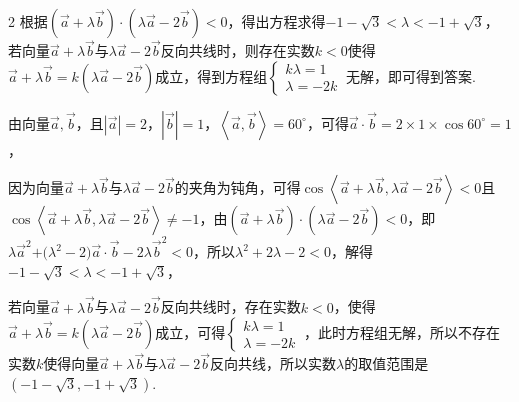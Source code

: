 \begin{multicols}{2}
\bindp [分析]根据\(\left( \overrightarrow{a} + \lambda\overrightarrow{b} \right) \cdot \left( \lambda\overrightarrow{a} - 2\overrightarrow{b} \right) < 0\)，得出方程求得\(- 1 - \sqrt{3} < \lambda < - 1 + \sqrt{3}\)，若向量\(\overrightarrow{a} + \lambda\overrightarrow{b}\)与\(\lambda\overrightarrow{a} - 2\overrightarrow{b}\)反向共线时，则存在实数\(k < 0\)使得\(\overrightarrow{a} + \lambda\overrightarrow{b} = k(\lambda\overrightarrow{a} - 2\overrightarrow{b})\)成立，得到方程组\(\left\{ \begin{array}{r}
k\lambda = 1 \\
\lambda = - 2k
\end{array} \right.\ \)无解，即可得到答案.

\bindp [详解]由向量\(\overrightarrow{a},\overrightarrow{b}\)，且\(\left| \overrightarrow{a} \right| = 2\)，\(\left| \overrightarrow{b} \right| = 1\)，\(\left\langle \overrightarrow{a},\overrightarrow{b} \right\rangle = 60^{\circ}\)，可得\(\overrightarrow{a} \cdot \overrightarrow{b} = 2 \times 1 \times \cos 60^{\circ} = 1\)，

\bindp 因为向量\(\overrightarrow{a} + \lambda\overrightarrow{b}\)与\(\lambda\overrightarrow{a} - 2\overrightarrow{b}\)的夹角为钝角，可得\(\cos\left\langle \overrightarrow{a} + \lambda\overrightarrow{b},\lambda\overrightarrow{a} - 2\overrightarrow{b} \right\rangle < 0\)且\(\cos\left\langle \overrightarrow{a} + \lambda\overrightarrow{b},\lambda\overrightarrow{a} - 2\overrightarrow{b} \right\rangle \neq - 1\)，由\(\left( \overrightarrow{a} + \lambda\overrightarrow{b} \right) \cdot \left( \lambda\overrightarrow{a} - 2\overrightarrow{b} \right) < 0\)，即\(\lambda{\overrightarrow{a}}^{2}\text{+(}\lambda^{2} - 2)\overrightarrow{a} \cdot \overrightarrow{b} - 2\lambda{\overrightarrow{b}}^{2} < 0\)，所以\(\lambda^{2} + 2\lambda - 2 < 0\)，解得\(- 1 - \sqrt{3} < \lambda < - 1 + \sqrt{3}\)，

\bindp 若向量\(\overrightarrow{a} + \lambda\overrightarrow{b}\)与\(\lambda\overrightarrow{a} - 2\overrightarrow{b}\)反向共线时，存在实数\(k < 0\)，使得\(\overrightarrow{a} + \lambda\overrightarrow{b} = k(\lambda\overrightarrow{a} - 2\overrightarrow{b})\)成立，可得\(\left\{ \begin{array}{r}
k\lambda = 1 \\
\lambda = - 2k
\end{array} \right.\ \)，此时方程组无解，所以不存在实数\(k\)使得向量\(\overrightarrow{a} + \lambda\overrightarrow{b}\)与\(\lambda\overrightarrow{a} - 2\overrightarrow{b}\)反向共线，所以实数\(\lambda\)的取值范围是\(\left( - 1 - \sqrt{3}, - 1 + \sqrt{3} \right)\).


\end{multicols}
